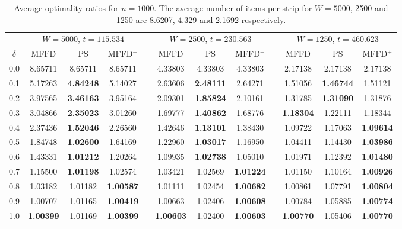 \documentclass[oribibl]{llncs}
\begin{document}
\begin{table}[!htb]
	\centering
	\caption{Average optimality ratios for $n = 1000$. The average number of items per strip for $W = 5000$, 2500 and 1250 are 8.6207, 4.329 and 2.1692 respectively.}
	\begin{tabular}{@{}c@{\hspace{25pt}}c@{\hspace{8pt}}c@{\hspace{8pt}}ccc@{\hspace{8pt}}c@{\hspace{8pt}}ccc@{\hspace{8pt}}c@{\hspace{8pt}}c@{}}\toprule
		& \multicolumn{3}{c}{$W = 5000$, $t = 115.534$} & \phantom{abcd} & \multicolumn{3}{c}{$W = 2500$, $t = 230.563$} & \phantom{abcd} & \multicolumn{3}{c}{$W = 1250$, $t = 460.623$} \\
		\cmidrule{2-4} \cmidrule{6-8} \cmidrule{10-12}
		$\delta$ & MFFD & PS & MFFD$^+$ && MFFD & PS & MFFD$^+$ && MFFD & PS & MFFD$^+$\\ \midrule
		0.0 & 8.65711 & 8.65711 & 8.65711 && 4.33803 & 4.33803 & 4.33803 && 2.17138 & 2.17138 & 2.17138 \\
		0.1 & 5.17263 & \textbf{4.84248} & 5.14027 && 2.63606 & \textbf{2.48111} & 2.64271 && 1.51056 & \textbf{1.46744} & 1.51121 \\
		0.2 & 3.97565 & \textbf{3.46163} & 3.95164 && 2.09301 & \textbf{1.85824} & 2.10161 && 1.31785 & \textbf{1.31090} & 1.31876 \\
		0.3 & 3.04866 & \textbf{2.35023} & 3.01260 && 1.69777 & \textbf{1.40862} & 1.68776 && \textbf{1.18304} & 1.22111 & 1.18344 \\
		0.4 & 2.37436 & \textbf{1.52046} & 2.26560 && 1.42646 & \textbf{1.13101} & 1.38430 && 1.09722 & 1.17063 & \textbf{1.09614} \\
		0.5 & 1.84748 & \textbf{1.02600} & 1.64169 && 1.22960 & \textbf{1.03017} & 1.16950 && 1.04411 & 1.14430 & \textbf{1.03986} \\
		0.6 & 1.43331 & \textbf{1.01212} & 1.20264 && 1.09935 & \textbf{1.02738} & 1.05010 && 1.01971 & 1.12392 & \textbf{1.01480} \\
		0.7 & 1.15500 & \textbf{1.01198} & 1.02574 && 1.03421 & 1.02569 & \textbf{1.01224} && 1.01150 & 1.10164 & \textbf{1.00926} \\
		0.8 & 1.03182 & 1.01182 & \textbf{1.00587} && 1.01111 & 1.02454 & \textbf{1.00682} && 1.00861 & 1.07791 & \textbf{1.00804} \\
		0.9 & 1.00707 & 1.01165 & \textbf{1.00419} && 1.00663 & 1.02406 & \textbf{1.00608} && 1.00784 & 1.05885 & \textbf{1.00774} \\
		1.0 & \textbf{1.00399} & 1.01169 & \textbf{1.00399} && \textbf{1.00603} & 1.02400 & \textbf{1.00603} && \textbf{1.00770} & 1.05406 & \textbf{1.00770} \\
		\bottomrule
	\end{tabular}
	\label{table:n=1000}	
\end{table}
\end{document}
